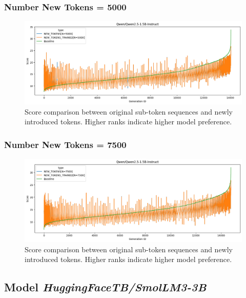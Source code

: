 \subsubsection*{Number New Tokens = 5000}
\begin{figure}[H]
    \centering
    \includegraphics[width=\textwidth]{Figures/Appendix/token-rank-comparison_5000_qwen.png}
    \caption{Score comparison between original sub-token sequences and newly introduced tokens. Higher ranks indicate higher model preference.}
    \label{fig:new_token_rank:5000_qwen}
\end{figure}
\FloatBarrier

\subsubsection*{Number New Tokens = 7500}
\begin{figure}[H]
    \centering
    \includegraphics[width=\textwidth]{Figures/Appendix/token-rank-comparison_7500_qwen.png}
    \caption{Score comparison between original sub-token sequences and newly introduced tokens. Higher ranks indicate higher model preference.}
    \label{fig:new_token_rank:7500_qwen}
\end{figure}
\FloatBarrier


\subsection*{Model \textit{HuggingFaceTB/SmolLM3-3B}}

